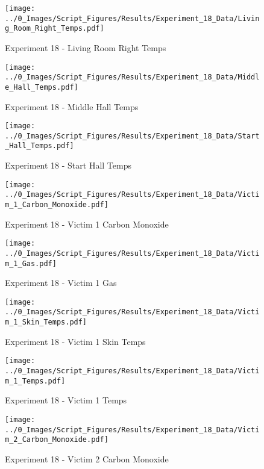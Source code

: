 	\clearpage

	\begin{figure}[H]
		\centering
		\texttt{[image: ../0\_Images/Script\_Figures/Results/Experiment\_18\_Data/Living\_Room\_Right\_Temps.pdf]}
		\caption[]{Experiment 18 - Living Room Right Temps}
	\end{figure}
 

	\begin{figure}[H]
		\centering
		\texttt{[image: ../0\_Images/Script\_Figures/Results/Experiment\_18\_Data/Middle\_Hall\_Temps.pdf]}
		\caption[]{Experiment 18 - Middle Hall Temps}
	\end{figure}
 
	\clearpage

	\begin{figure}[H]
		\centering
		\texttt{[image: ../0\_Images/Script\_Figures/Results/Experiment\_18\_Data/Start\_Hall\_Temps.pdf]}
		\caption[]{Experiment 18 - Start Hall Temps}
	\end{figure}
 

	\begin{figure}[H]
		\centering
		\texttt{[image: ../0\_Images/Script\_Figures/Results/Experiment\_18\_Data/Victim\_1\_Carbon\_Monoxide.pdf]}
		\caption[]{Experiment 18 - Victim 1 Carbon Monoxide}
	\end{figure}
 
	\clearpage

	\begin{figure}[H]
		\centering
		\texttt{[image: ../0\_Images/Script\_Figures/Results/Experiment\_18\_Data/Victim\_1\_Gas.pdf]}
		\caption[]{Experiment 18 - Victim 1 Gas}
	\end{figure}
 

	\begin{figure}[H]
		\centering
		\texttt{[image: ../0\_Images/Script\_Figures/Results/Experiment\_18\_Data/Victim\_1\_Skin\_Temps.pdf]}
		\caption[]{Experiment 18 - Victim 1 Skin Temps}
	\end{figure}
 
	\clearpage

	\begin{figure}[H]
		\centering
		\texttt{[image: ../0\_Images/Script\_Figures/Results/Experiment\_18\_Data/Victim\_1\_Temps.pdf]}
		\caption[]{Experiment 18 - Victim 1 Temps}
	\end{figure}
 

	\begin{figure}[H]
		\centering
		\texttt{[image: ../0\_Images/Script\_Figures/Results/Experiment\_18\_Data/Victim\_2\_Carbon\_Monoxide.pdf]}
		\caption[]{Experiment 18 - Victim 2 Carbon Monoxide}
	\end{figure}
 
